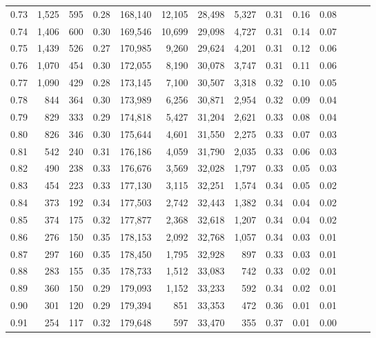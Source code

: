 \begin{tabular}{rrrrrrrrrrrrrr}
0.73 &  1,525 &  595 &  0.28 &  168,140 &   12,105 &  28,498 &   5,327 &  0.31 &  0.16 &      0.08 \\
0.74 &  1,406 &  600 &  0.30 &  169,546 &   10,699 &  29,098 &   4,727 &  0.31 &  0.14 &      0.07 \\
0.75 &  1,439 &  526 &  0.27 &  170,985 &    9,260 &  29,624 &   4,201 &  0.31 &  0.12 &      0.06 \\
0.76 &  1,070 &  454 &  0.30 &  172,055 &    8,190 &  30,078 &   3,747 &  0.31 &  0.11 &      0.06 \\
0.77 &  1,090 &  429 &  0.28 &  173,145 &    7,100 &  30,507 &   3,318 &  0.32 &  0.10 &      0.05 \\
0.78 &    844 &  364 &  0.30 &  173,989 &    6,256 &  30,871 &   2,954 &  0.32 &  0.09 &      0.04 \\
0.79 &    829 &  333 &  0.29 &  174,818 &    5,427 &  31,204 &   2,621 &  0.33 &  0.08 &      0.04 \\
0.80 &    826 &  346 &  0.30 &  175,644 &    4,601 &  31,550 &   2,275 &  0.33 &  0.07 &      0.03 \\
0.81 &    542 &  240 &  0.31 &  176,186 &    4,059 &  31,790 &   2,035 &  0.33 &  0.06 &      0.03 \\
0.82 &    490 &  238 &  0.33 &  176,676 &    3,569 &  32,028 &   1,797 &  0.33 &  0.05 &      0.03 \\
0.83 &    454 &  223 &  0.33 &  177,130 &    3,115 &  32,251 &   1,574 &  0.34 &  0.05 &      0.02 \\
0.84 &    373 &  192 &  0.34 &  177,503 &    2,742 &  32,443 &   1,382 &  0.34 &  0.04 &      0.02 \\
0.85 &    374 &  175 &  0.32 &  177,877 &    2,368 &  32,618 &   1,207 &  0.34 &  0.04 &      0.02 \\
0.86 &    276 &  150 &  0.35 &  178,153 &    2,092 &  32,768 &   1,057 &  0.34 &  0.03 &      0.01 \\
0.87 &    297 &  160 &  0.35 &  178,450 &    1,795 &  32,928 &     897 &  0.33 &  0.03 &      0.01 \\
0.88 &    283 &  155 &  0.35 &  178,733 &    1,512 &  33,083 &     742 &  0.33 &  0.02 &      0.01 \\
0.89 &    360 &  150 &  0.29 &  179,093 &    1,152 &  33,233 &     592 &  0.34 &  0.02 &      0.01 \\
0.90 &    301 &  120 &  0.29 &  179,394 &      851 &  33,353 &     472 &  0.36 &  0.01 &      0.01 \\
0.91 &    254 &  117 &  0.32 &  179,648 &      597 &  33,470 &     355 &  0.37 &  0.01 &      0.00 \\

\end{tabular}
